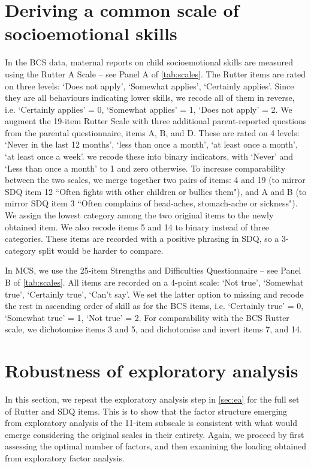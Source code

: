 
\section{Deriving a common scale of socioemotional skills}\label{asec:scales}

In the BCS data, maternal reports on child socioemotional skills are measured using the Rutter A Scale \citep{Rutter1970} -- see Panel A of \autoref{tab:scales}. The Rutter items are rated on three levels: `Does not apply', `Somewhat applies', `Certainly applies'. Since they are all behaviours indicating lower skills, we recode all of them in reverse, i.e. `Certainly applies' = 0, `Somewhat applies' = 1, `Does not apply' = 2. We augment the 19-item Rutter Scale with three additional parent-reported questions from the parental questionnaire, items A, B, and D. These are rated on 4 levels: `Never in the last 12 months', `less than once a month', `at least once a month', `at least once a week'. we recode these into binary indicators, with `Never' and `Less than once a month' to 1 and zero otherwise. To increase comparability between the two scales, we merge together two pairs of items: 4 and 19 (to mirror SDQ item 12 ``Often fights with other children or bullies them"), and A and B (to mirror SDQ item 3 ``Often complains of head-aches, stomach-ache or sickness"). We assign the lowest category among the two original items to the newly obtained item. We also recode items 5 and 14 to binary instead of three categories. These items are recorded with a positive phrasing in SDQ, so a 3-category split would be harder to compare.

In MCS, we use the 25-item Strengths and Difficulties Questionnaire \citep{Goodman1997} -- see Panel B of \autoref{tab:scales}. All items are recorded on a 4-point scale: `Not true', `Somewhat true', `Certainly true', `Can't say'. We set the latter option to missing and recode the rest in ascending order of skill as for the BCS items, i.e. `Certainly true' = 0, `Somewhat true' = 1, `Not true' = 2. For comparability with the BCS Rutter scale, we dichotomise items 3 and 5, and dichotomise and invert items 7, and 14.

\section{Robustness of exploratory analysis}\label{asec:fullefa}

In this section, we repeat the exploratory analysis step in \autoref{sec:ea} for the full set of Rutter and SDQ items. This is to show that the factor structure emerging from exploratory analysis of the 11-item subscale is consistent with what would emerge considering the original scales in their entirety. Again, we proceed by first assessing the optimal number of factors, and then examining the loading obtained from exploratory factor analysis.

